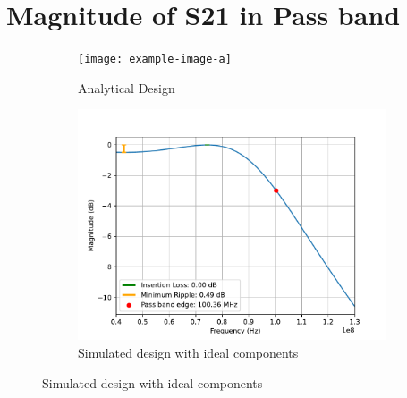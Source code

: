 \documentclass[letterpaper,12pt]{article}
\begin{document}
\section{Magnitude of S21 in Pass band}
\begin{figure}[H]
    \begin{subfigure}[t]{.49\textwidth}
      \centering
      \texttt{[image: example-image-a]}
      \caption{Analytical Design}
    \end{subfigure}
    \hfill
    \begin{subfigure}[t]{.49\textwidth}
      \centering
      \includegraphics[width=\linewidth]{figures/4.ideal}
      \caption{Simulated design with ideal components}
    \end{subfigure}
  
    \medskip
  

\end{figure}
\end{document}

